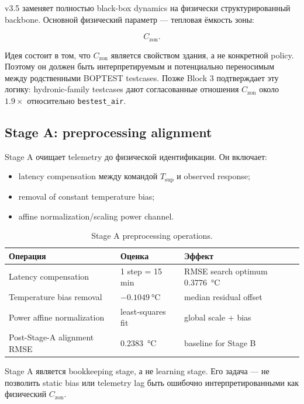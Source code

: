 \documentclass[12pt,a4paper]{article}
\begin{document}
v3.5 заменяет полностью black-box dynamics на физически структурированный backbone. Основной физический параметр --- тепловая ёмкость зоны:

\[
C_{\mathrm{zon}}.
\]

Идея состоит в том, что \(C_{\mathrm{zon}}\) является свойством здания, а не конкретной policy. Поэтому он должен быть интерпретируемым и потенциально переносимым между родственными BOPTEST testcases. Позже Block 3 подтверждает эту логику: hydronic-family testcases дают согласованные отношения \(C_{\mathrm{zon}}\) около \(1.9\times\) относительно \texttt{bestest\_air}.

\subsection{Stage A: preprocessing alignment}

Stage A очищает telemetry до физической идентификации. Он включает:

\begin{itemize}
    \item latency compensation между командой \(T_{\mathrm{sup}}\) и observed response;
    \item removal of constant temperature bias;
    \item affine normalization/scaling power channel.
\end{itemize}

\begin{table}[htbp]
\centering
\caption{Stage A preprocessing operations.}
\label{tab:stage-a}
\begin{tabular}{lll}
\toprule
Операция & Оценка & Эффект \\
\midrule
Latency compensation & 1 step = 15 min & RMSE search optimum \SI{0.3776}{\celsius} \\
Temperature bias removal & \(-\SI{0.1049}{\celsius}\) & median residual offset \\
Power affine normalization & least-squares fit & global scale + bias \\
Post-Stage-A alignment RMSE & \SI{0.2383}{\celsius} & baseline for Stage B \\
\bottomrule
\end{tabular}
\end{table}

Stage A является bookkeeping stage, а не learning stage. Его задача --- не позволить static bias или telemetry lag быть ошибочно интерпретированными как физический \(C_{\mathrm{zon}}\).
\end{document}
